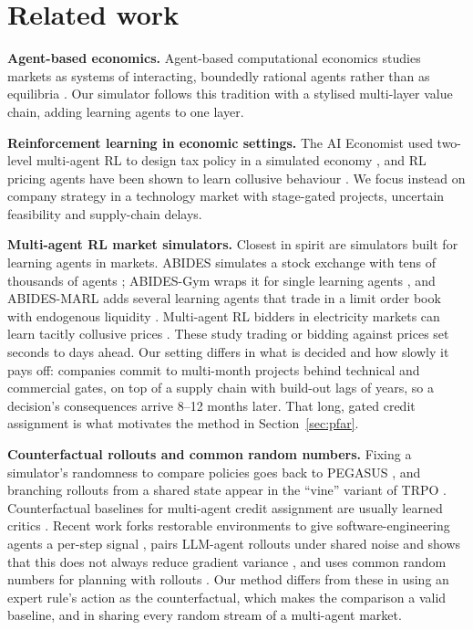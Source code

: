 \documentclass[11pt]{article}
\begin{document}
\section{Related work}
\label{sec:related}

\textbf{Agent-based economics.} Agent-based computational economics studies markets as systems of interacting, boundedly rational agents rather than as equilibria \citep{tesfatsion2006ace,farmer2009economy}. Our simulator follows this tradition with a stylised multi-layer value chain, adding learning agents to one layer.

\textbf{Reinforcement learning in economic settings.} The AI Economist used two-level multi-agent RL to design tax policy in a simulated economy \citep{zheng2022aieconomist}, and RL pricing agents have been shown to learn collusive behaviour \citep{calvano2020collusion}. We focus instead on company strategy in a technology market with stage-gated projects, uncertain feasibility and supply-chain delays.

\textbf{Multi-agent RL market simulators.} Closest in spirit are simulators built for learning agents in markets. ABIDES simulates a stock exchange with tens of thousands of agents \citep{byrd2019abides}; ABIDES-Gym wraps it for single learning agents \citep{amrouni2021abidesgym}, and ABIDES-MARL adds several learning agents that trade in a limit order book with endogenous liquidity \citep{cheridito2025abidesmarl}. Multi-agent RL bidders in electricity markets can learn tacitly collusive prices \citep{seredynski2026electricity}. These study trading or bidding against prices set seconds to days ahead. Our setting differs in what is decided and how slowly it pays off: companies commit to multi-month projects behind technical and commercial gates, on top of a supply chain with build-out lags of years, so a decision's consequences arrive 8--12 months later. That long, gated credit assignment is what motivates the method in Section~\ref{sec:pfar}.

\textbf{Counterfactual rollouts and common random numbers.} Fixing a simulator's randomness to compare policies goes back to PEGASUS \citep{ng2000pegasus}, and branching rollouts from a shared state appear in the ``vine'' variant of TRPO \citep{schulman2015trpo}. Counterfactual baselines for multi-agent credit assignment are usually learned critics \citep{foerster2018coma}. Recent work forks restorable environments to give software-engineering agents a per-step signal \citep{li2026crr}, pairs LLM-agent rollouts under shared noise and shows that this does not always reduce gradient variance \citep{sakib2026luck}, and uses common random numbers for planning with rollouts \citep{yadav2026crn}. Our method differs from these in using an expert rule's action as the counterfactual, which makes the comparison a valid baseline, and in sharing every random stream of a multi-agent market.
\end{document}
